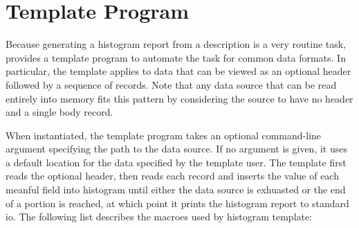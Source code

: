 \section{Template Program}
Because generating a histogram report from a \pads{} description is a
very routine task, \pads{} provides a template program to automate the
task for common data formats. In particular, the template applies to
data that can be viewed as an optional header followed by a sequence
of records. Note that any data source that can be read entirely into
memory fits this pattern by considering the source to have no header
and a single body record. 

When instantiated, the template program takes an optional command-line
argument specifying the path to the data source. If no argument is
given, it uses a default location for the data specified by the
template user. The template first reads the optional header, then
reads each record and inserts the value of each meanful field into
histogram until either the data source is exhuasted or the end of a
portion is reached, at which point it prints the histogram report to
standard io. The following list describes the macroes used by
histogram template:


